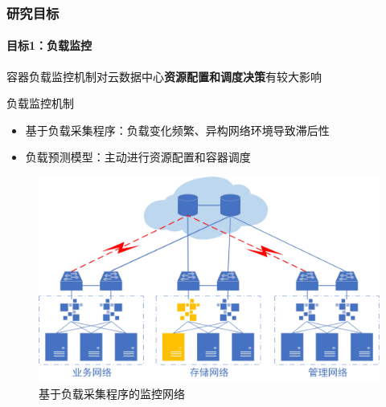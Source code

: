 \begin{frame}
\frametitle{研究目标}
\framesubtitle{目标1：负载监控}
容器负载监控机制对云数据中心\textbf{\alert{资源配置和调度决策}}有较大影响

\begin{block}{负载监控机制}
\begin{itemize}
    \item<1-> 基于负载采集程序：负载变化频繁、异构网络环境导致滞后性
    \item<2-> 负载预测模型：主动进行资源配置和容器调度
\end{itemize}
\end{block}
\begin{figure}[htb]
\centering
    \includegraphics[scale=0.41]{figures/fig3_mmn.jpg}
    \caption{基于负载采集程序的监控网络}
    \label{fig:fig3}
\end{figure}
\end{frame}

